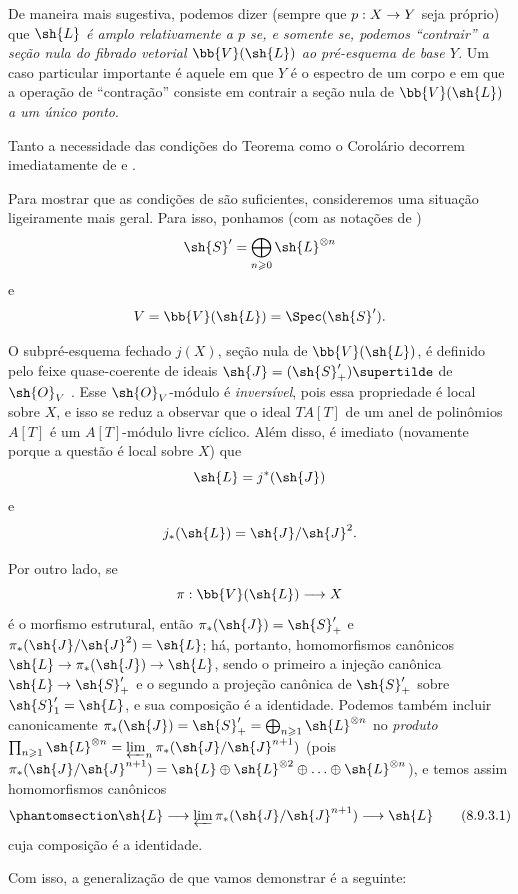 \documentclass[oneside,10pt]{amsart}
\makeatletter
\renewcommand{\geq}{\geqslant}
\newcommand{\ega@arrow}[2]{\mathchoice{#1}{#2}{#2}{#2}}
\renewcommand{\to}{\ega@arrow{\longrightarrow}{\rightarrow}}
\let\EGAOriginalLabel\label
\renewcommand{\label}[1]{\phantomsection\EGAOriginalLabel{#1}}
\makeatother
\begin{document}
De maneira mais sugestiva, podemos dizer (sempre que $p:X\to Y$ seja próprio) que \emph{$\sh{L}$ é amplo relativamente a $p$ se, e somente se, podemos “\emph{contrair}” a seção nula do fibrado vetorial $\bb{V}(\sh{L})$ ao pré-esquema de base $Y$.}
Um caso particular importante é aquele em que $Y$ é o espectro de um corpo e em que a operação de “contração” consiste em contrair a seção nula de $\bb{V}(\sh{L})$ \emph{a um único ponto}.

\begin{env}[8.9.3]
\label{II.8.9.3}
Tanto a necessidade das condições do Teorema  como o Corolário  decorrem imediatamente de  e .

Para mostrar que as condições de  são suficientes, consideremos uma situação ligeiramente mais geral.
Para isso, ponhamos (com as notações de )
\[
  \sh{S}'=\bigoplus_{n\geq 0}\sh{L}^{\otimes n}
\]
e
\[
  V=\bb{V}(\sh{L})=\Spec(\sh{S}').
\]

O subpré-esquema fechado $j(X)$, seção nula de $\bb{V}(\sh{L})$, é definido pelo feixe quase-coerente de ideais $\sh{J}=(\sh{S}'_+)\supertilde$ de $\sh{O}_V$ .
Esse $\sh{O}_V$-módulo é \emph{inversível}, pois essa propriedade é local sobre $X$, e isso se reduz a observar que o ideal $TA[T]$ de um anel de polinômios $A[T]$ é um $A[T]$-módulo livre cíclico.
Além disso, é imediato (novamente porque a questão é local sobre $X$) que
\[
  \sh{L}=j^*(\sh{J})
\]
e
\[
  j_*(\sh{L})=\sh{J}/\sh{J}^2.
\]

Por outro lado, se
\[
  \pi:\bb{V}(\sh{L})\to X
\]
é o morfismo estrutural, então $\pi_*(\sh{J})=\sh{S}'_+$ e $\pi_*(\sh{J}/\sh{J}^2)=\sh{L}$;
há, portanto, homomorfismos canônicos $\sh{L}\to\pi_*(\sh{J})\to\sh{L}$, sendo o primeiro a injeção canônica $\sh{L}\to\sh{S}'_+$ e o segundo a projeção canônica de $\sh{S}'_+$ sobre $\sh{S}'_1=\sh{L}$, e sua composição é a identidade.
Podemos também incluir canonicamente $\pi_*(\sh{J}) = \sh{S}'_+ = \bigoplus_{n\geq1}\sh{L}^{\otimes n}$ no \emph{produto} $\prod_{n\geq1}\sh{L}^{\otimes n} = \varprojlim_n \pi_*(\sh{J}/\sh{J}^{n+1})$ (pois $\pi_*(\sh{J}/\sh{J}^{n+1}) = \sh{L}\oplus\sh{L}^{\otimes 2}\oplus\ldots\oplus\sh{L}^{\otimes n}$), e temos assim homomorfismos canônicos
\[
\label{II.8.9.3.1}
  \sh{L}\to\varprojlim\pi_*(\sh{J}/\sh{J}^{n+1})\to\sh{L}
  \tag{8.9.3.1}
\]
cuja composição é a identidade.

Com isso, a generalização de  que vamos demonstrar é a seguinte:
\end{env}
\end{document}
